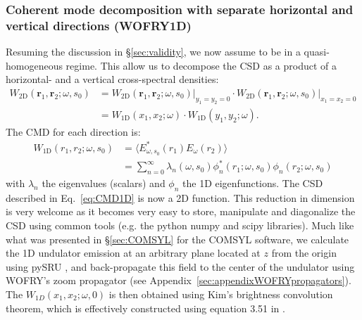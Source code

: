 \documentclass{iucr}              %
\begin{document}
\subsubsection{Coherent mode decomposition with separate horizontal and vertical directions (WOFRY1D)\\}\label{sec:WOFRY1D}

Resuming the discussion in \S\ref{sec:validity}, we now assume to be in a quasi-homogeneous regime. This allow us to decompose the CSD as a product of a horizontal- and a vertical cross-spectral densities:
\begin{equation}\label{eq:CSD_2D_bis}
\begin{split}
W_\text{2D}(\textbf{r}_1,\textbf{r}_2;\omega,s_0) &= W_\text{2D}(\textbf{r}_1,\textbf{r}_2;\omega,s_0)\big\rvert_{y_1=y_2=0} \cdot W_\text{2D}(\textbf{r}_1,\textbf{r}_2;\omega,s_0)\big\rvert_{x_1=x_2=0}\\
&= W_\text{1D}(x_1,x_2;\omega)\cdot W_\text{1D}(y_1,y_2;\omega).
\end{split}
\end{equation}
The CMD for each direction is:
\begin{equation}\begin{split}
W_\text{1D}(r_1,r_2;\omega,s_0) &= \big\langle E^*_{\omega,s_0}(r_1) E_{\omega}(r_2)\big\rangle \\&=  \sum_{n=0}^{\infty} \lambda_n(\omega,s_0) \phi_n^*(r_1;\omega,s_0) \phi_n(r_2;\omega,s_0) 
\end{split}\label{eq:CMD1D}
\end{equation}
with $\lambda_n$ the eigenvalues (scalars) and $\phi_n$ the 1D eigenfunctions. The CSD described in Eq.~\ref{eq:CMD1D} is now a 2D function. This reduction in dimension is very welcome as it becomes very easy to store, manipulate and diagonalize the CSD using common tools (e.g. the python numpy and scipy libraries). Much like what was presented in \S\ref{sec:COMSYL} for the COMSYL software,  we calculate the 1D undulator emission at an arbitrary plane located at $z$ from the origin using pySRU \cite{pySRU}, and back-propagate this field  to the center of the undulator using WOFRY's zoom propagator (see Appendix~\ref{sec:appendixWOFRYpropagators}). The $W_{1D}(x_1,x_2;\omega,0)$ is then obtained using Kim's brightness convolution theorem, which is effectively constructed using equation 3.51 in \cite{glass2017}.
\end{document}
